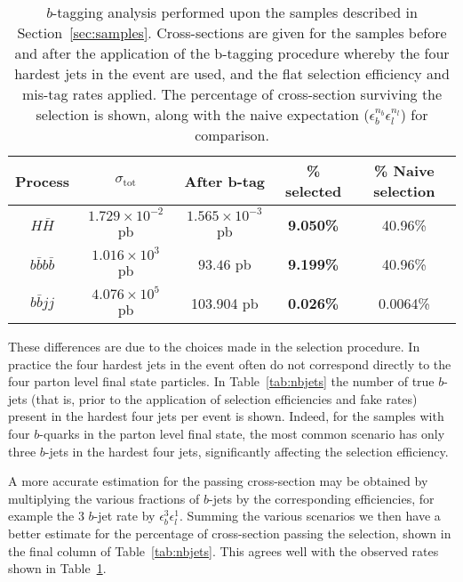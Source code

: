 \documentclass[12pt]{article}
\begin{document}
\begin{table}[h]
\begin{center}
\begin{tabular}{|c|c|c|c|c|}
\hline
Process & $\sigma_{\mathrm{tot}}$ & After b-tag & \% selected & \% Naive selection \\
\hline \hline
$H\bar{H}$ & $1.729 \times 10^{-2}$ pb & $1.565\times 10^{-3}$ pb & \textbf{9.050\%} & 40.96\% \\
\hline
$b\bar{b}b\bar{b}$ & $1.016 \times10^3$ pb & $93.46$ pb & \textbf{9.199\%} & 40.96\%\\
$b\bar{b}jj$ &  $4.076 \times 10^5$ pb & 103.904 pb & \textbf{0.026\%} & 0.0064\% \\
\hline
\end{tabular}
\end{center}
\caption{$b$-tagging analysis performed upon the samples described in Section~\ref{sec:samples}. Cross-sections are given for the samples before and after the application of the b-tagging procedure whereby the four hardest jets in the event are used, and the flat selection efficiency and mis-tag rates applied. The percentage of cross-section surviving the selection is shown, along with the naive expectation ($\epsilon_b^{n_b}\epsilon_l^{n_l}$) for comparison.} \label{tab:btageff1}
\end{table}%

These differences are due to the choices made in the selection procedure. In practice the four hardest jets in the event often do not correspond directly to the four parton level final state particles. In Table~\ref{tab:nbjets} the number of true $b$-jets (that is, prior to the application of selection efficiencies and fake rates) present in the hardest four jets per event is shown. Indeed, for the samples with four $b$-quarks in the parton level final state, the most common scenario has only three $b$-jets in the hardest four jets, significantly affecting the selection efficiency.

 A more accurate estimation for the passing cross-section may be obtained by multiplying the various fractions of $b$-jets by the corresponding efficiencies, for example the 3 $b$-jet rate by $\epsilon_b^{3}\epsilon_l^{1}$. Summing the various scenarios we then have a better estimate for the percentage of cross-section passing the selection, shown in the final column of Table~\ref{tab:nbjets}. This agrees well with the observed rates shown in Table~\ref{tab:btageff1}.
\end{document}
